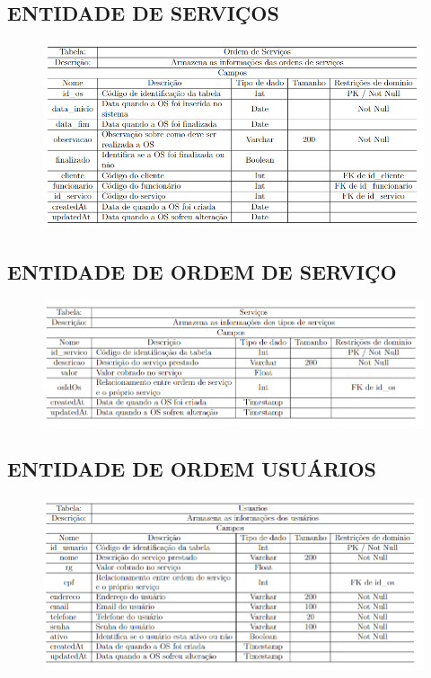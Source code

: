\subsection{ENTIDADE DE SERVIÇOS}
\begin{figure}[htb]
	\begin{center}
	    \includegraphics[width=1\linewidth]{imagens/dc3.png}
	\end{center}
\end{figure}


\subsection{ENTIDADE DE ORDEM DE SERVIÇO}
\begin{figure}[htb]
	\begin{center}
	    \includegraphics[width=1\linewidth]{imagens/dc4.png}
	\end{center}
\end{figure}

\newpage
\subsection{ENTIDADE DE ORDEM USUÁRIOS}
\begin{figure}[htb]
	\begin{center}
	    \includegraphics[width=1\linewidth]{imagens/dc5.png}
	\end{center}
\end{figure}


